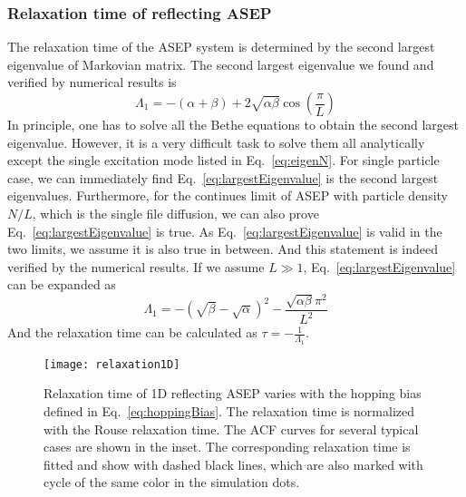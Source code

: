 \subsubsection{Relaxation time of reflecting ASEP}
\label{ssub:Relaxation time of reflecting ASEP}
The relaxation time of the ASEP system is determined by the second largest eigenvalue of Markovian matrix. The second largest eigenvalue we found and verified by numerical results is 
\begin{equation}
    \label{eq:largestEigenvalue}
    \Lambda_1 = -(\alpha+\beta) + 2\sqrt{\alpha\beta}\cos(\frac{\pi}{L})
\end{equation}
In principle, one has to solve all the Bethe equations to obtain the second largest eigenvalue. However, it is a very difficult task to solve them all analytically except the single excitation mode listed in Eq.~\eqref{eq:eigenN}. For single particle case, we can immediately find Eq.~\eqref{eq:largestEigenvalue} is the second largest eigenvalues. Furthermore, for the continues limit of ASEP with particle density $N/L$, which is the single file diffusion, we can also prove Eq.~\eqref{eq:largestEigenvalue} is true. As Eq.~\eqref{eq:largestEigenvalue} is valid in the two limits, we assume it is also true in between. And this statement is indeed verified by the numerical results.
If we assume $L \gg 1$, Eq.~\eqref{eq:largestEigenvalue} can be expanded as
\begin{equation}
    \label{eq:largestEigenvalueExpanded}
    \Lambda_1 = -(\sqrt{\beta}-\sqrt{\alpha})^2 -
    \frac{\sqrt{\alpha\beta}\pi^2}{L^2}
\end{equation}
And the relaxation time can be calculated as $\tau = -\frac{1}{\Lambda_1}$.

\begin{figure}[htpb]
    \centering
    \texttt{[image: relaxation1D]}
    \caption{Relaxation time of 1D reflecting ASEP varies with the hopping bias defined in Eq.~\eqref{eq:hoppingBias}. The relaxation time is normalized with the Rouse relaxation time. The ACF curves for several typical cases are shown in the inset. The corresponding relaxation time is fitted and show with dashed black lines, which are also marked with cycle of the same color in the simulation dots. }
    \label{fig:relaxation1D}
\end{figure}

